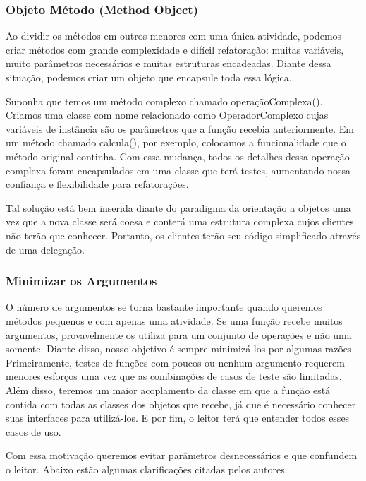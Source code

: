 


\subsubsection{Objeto Método (Method Object)}
Ao dividir os métodos em outros menores com uma única atividade, podemos criar métodos com grande complexidade e difícil refatoração: muitas variáveis, muito parâmetros necessários e muitas estruturas encadeadas. Diante dessa situação, podemos criar um objeto que encapsule toda essa lógica. 
	
Suponha que temos um método complexo chamado operaçãoComplexa(). Criamos uma classe com nome relacionado como OperadorComplexo cujas variáveis de instância são os parâmetros que a função recebia anteriormente. Em um método chamado calcula(), por exemplo, colocamos a funcionalidade que o método original continha. Com essa mudança, todos os detalhes dessa operação complexa foram encapsulados em uma classe que terá testes, aumentando nossa confiança e flexibilidade para refatorações.
	
Tal solução está bem inserida diante do paradigma da orientação a objetos uma vez que a nova  classe será coesa e conterá uma estrutura complexa cujos clientes não terão que conhecer. Portanto, os clientes terão seu código simplificado através de uma delegação.

\subsubsection{Minimizar os Argumentos}
O número de argumentos se torna bastante importante quando queremos métodos pequenos e com apenas uma atividade. Se uma função recebe muitos argumentos, provavelmente os utiliza para um conjunto de operações e não uma somente. Diante disso, nosso objetivo é sempre minimizá-los por algumas razões. 	Primeiramente, testes de funções com poucos ou nenhum argumento requerem menores esforços  uma vez que as combinações de casos de teste são limitadas. Além disso, teremos um maior acoplamento da classe em que a função está contida com todas as classes dos objetos que recebe, já que é necessário conhecer suas interfaces para utilizá-los. E por fim, o leitor terá que entender todos esses casos de uso.

Com essa motivação queremos evitar parâmetros desnecessários e que confundem o leitor. Abaixo estão algumas clarificações citadas pelos autores.

